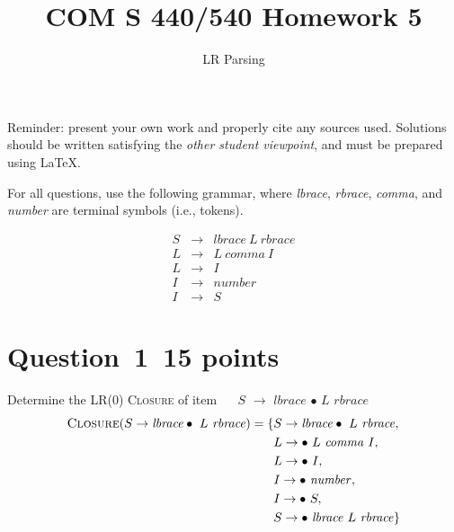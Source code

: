 \documentclass[10pt]{article}
\title{COM S 440/540 Homework 5}
\date{}
\author{LR Parsing}
\begin{document}
\maketitle

\noindent
Reminder: present your own work and properly cite any sources used.
Solutions should be written satisfying the \emph{other student viewpoint},
and must be prepared using \LaTeX.
\renewcommand{\thepage}{~}
 
 
For all questions, use the following grammar, where
\emph{lbrace}, \emph{rbrace}, \emph{comma}, and \emph{number}
are terminal symbols (i.e., tokens).

\begin{eqnarray}
  S & \rightarrow & \mathit{lbrace} ~L~ \mathit{rbrace}
\\
  L & \rightarrow & L ~\mathit{comma}~ I
\\
  L & \rightarrow & I
\\
  I & \rightarrow & \mathit{number}
\\
  I & \rightarrow & S
\end{eqnarray}


\section*{Question~1~\hfill 15 points}

Determine the LR(0) \textsc{Closure} of item ~~
$S$ $\rightarrow$ $\mathit{lbrace}$ $\bullet$ $L$ $\mathit{rbrace}$
$$
  \begin{aligned}
    \textsc{Closure}(S \rightarrow \mathit{lbrace} \bullet \  L \  \mathit{rbrace}) = \{ & S \rightarrow \mathit{lbrace} \bullet \  L \  \mathit{rbrace},       \\                                                                      & L \rightarrow  \bullet \  L \ \mathit{comma} \ I, \\
                                                                                         & L \rightarrow  \bullet \  I,                                         \\
                                                                                         & I \rightarrow  \bullet \ \mathit{number},                            \\
                                                                                         & I \rightarrow  \bullet \ S,                                          \\
                                                                                         & S \rightarrow \bullet \  \mathit{lbrace}  \  L \  \mathit{rbrace} \} \\
  \end{aligned}
$$
\end{document}

